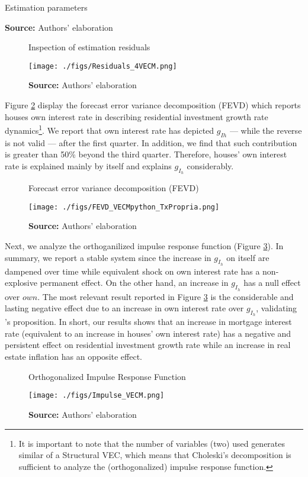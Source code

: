 \documentclass[12pt, a4]{article}
\begin{document}
\begin{table}[h!]
	\caption{Estimation parameters}
	\centering
	
	\caption*{\textbf{Source:} Authors' elaboration}
\end{table}

\begin{figure}
	\centering
	\caption{Inspection of estimation residuals}
	\label{residuos}
	\texttt{[image: ./figs/Residuals\_4VECM.png]}
	\caption*{\textbf{Source:} Authors' elaboration}
\end{figure}

Figure \ref{fevd} display the forecast error variance decomposition (FEVD) which reports houses own interest rate in describing residential investment growth rate dynamics\footnote{It is important to note that the number of variables (two) used generates similar  of a Structural VEC, which means that Choleski's decomposition is sufficient to analyze the (orthogonalized) impulse response function.}.
We report that own interest rate has  depicted  \(g_{Ih}\) --- while the reverse is not valid --- after the first quarter.
In addition, we find that such contribution is greater than 50\% beyond the third quarter.
Therefore, houses' own interest rate is explained mainly by itself and explains \(g_{I_h}\) considerably.

\begin{figure}[H]
	\centering
	\caption{Forecast error variance decomposition (FEVD)}
	\label{fevd}
	\texttt{[image: ./figs/FEVD\_VECMpython\_TxPropria.png]}
	\caption*{\textbf{Source:} Authors' elaboration}
\end{figure}

Next, we analyze the orthoganilized impulse response function (Figure \ref{irf}).
In summary, we report a stable system since the increase in \(g_{I_h}\) on itself are dampened over time while equivalent shock on own interest rate has a non-explosive permanent effect.
On the other hand, an increase in \(g_{I_h}\) has a null effect over \(own\).
The most relevant result reported in Figure \ref{irf} is the considerable and lasting negative effect due to an increase in own interest rate over \(g_{I_h}\), validating \citeauthor*{teixeira_crescimento_2015}'s \citeyear{teixeira_crescimento_2015} proposition.
In short, our results shows that an increase in mortgage interest rate (equivalent to an increase in houses' own interest rate) has a negative and persistent effect on residential investment growth rate while an increase in real estate inflation  has an opposite effect.
\begin{figure}[H]
	\centering
	\caption{Orthogonalized Impulse Response Function}
	\label{irf}
	\texttt{[image: ./figs/Impulse\_VECM.png]}
	\caption*{\textbf{Source:} Authors' elaboration}
\end{figure}
\end{document}
